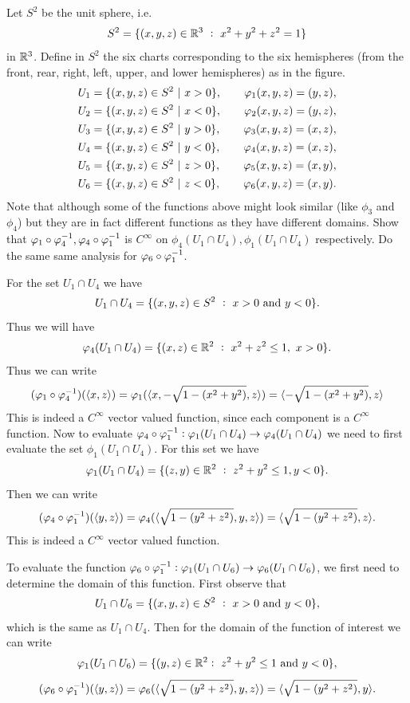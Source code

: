 \begin{problem}
	Let $ S^2 $ be the unit sphere, i.e.
	\[ S^2 = \{(x,y,z)\in\mathbb{R}^3\ :\ x^2+y^2+z^2 = 1\} \]
	in $ \mathbb{R}^3 $. Define in $ S^2 $ the six charts corresponding to the six hemispheres (from the front, rear, right, left, upper, and lower hemispheres) as in the figure.
	\begin{align*}
		U_1 = \{(x,y,z) \in S^2\ |\ x > 0\}, \qquad \varphi_1(x,y,z) = (y,z), \\
		U_2 = \{(x,y,z) \in S^2\ |\ x < 0\}, \qquad \varphi_2(x,y,z) = (y,z), \\
		U_3 = \{(x,y,z) \in S^2\ |\ y > 0\}, \qquad \varphi_3(x,y,z) = (x,z), \\
		U_4 = \{(x,y,z) \in S^2\ |\ y < 0\}, \qquad \varphi_4(x,y,z) = (x,z), \\
		U_5 = \{(x,y,z) \in S^2\ |\ z > 0\}, \qquad \varphi_5(x,y,z) = (x,y), \\
		U_6 = \{(x,y,z) \in S^2\ |\ z < 0\}, \qquad \varphi_6(x,y,z) = (x,y).
	\end{align*}
	Note that although some of the functions above might look similar (like $ \phi_3 $ and $ \phi_4 $) but they are in fact different functions as they have different domains. Show that $ \varphi_1\circ \varphi_4^{-1}, \varphi_4 \circ \varphi_1^{-1} $ is $ C^\infty $ on $ \phi_4(U_1 \cap U_4), \phi_1(U_1 \cap U_4) $ respectively. Do the same same analysis for $ \varphi_6 \circ \varphi_1^{-1}$.
	
\end{problem}
\begin{solution}
	For the set $ U_1 \cap U_4 $ we have
	\[ U_1 \cap U_4 = \{(x,y,z) \in S^2\ :\ x>0 \text{ and } y < 0 \}. \]
	Thus we will have
	\[ \varphi_4(U_1\cap U_4) = \{(x,z)\in \mathbb{R}^2 \ :\ x^2 + z^2 \leq 1,\ x>0\}. \]
	Thus we can write
	\[ (\varphi_1 \circ \varphi_4^{-1})(\langle x,z \rangle ) = \varphi_1(\langle x,-\sqrt{1-(x^2+y^2)},z \rangle) = \langle -\sqrt{1-(x^2+y^2)},z \rangle  \]
	This is indeed a $ C^\infty $ vector valued function, since each component is a $ C^\infty $ function. Now to evaluate $ \varphi_4 \circ \varphi_1^{-1}: \varphi_1(U_1 \cap U_4) \to \varphi_4(U_1\cap U_4) $ we need to first evaluate the set $ \phi_1(U_1 \cap U_4) $. For this set we have
	\[ \varphi_1(U_1 \cap U_4) = \{(z,y)\in\mathbb{R}^2\ :\ z^2 + y^2 \leq 1, y < 0\}. \]
	Then we can write
	\[ (\varphi_4 \circ \varphi_1^{-1})(\langle y,z \rangle ) = \varphi_4(\langle \sqrt{1-(y^2+z^2)}, y,z  \rangle) = \langle \sqrt{1-(y^2+z^2)} , z \rangle. \]
	This is indeed a $ C^\infty $ vector valued function. 
	
	To evaluate the function $ \varphi_6 \circ \varphi^{-1}_1: \varphi_1(U_1 \cap U_6) \to \varphi_6(U_1 \cap U_6) $, we first need to determine the domain of this function. First observe that 
	\[ U_1 \cap U_6 =  \set{(x,y,z) \in S^2\ :\ x>0 \text{ and } y<0}, \]
	which is the same as $ U_1 \cap U_4 $. Then for the domain of the function of interest we can write
	\[ \varphi_1(U_1 \cap U_6) = \{(y,z) \in \mathbb{R}^2 :\ z^2 + y^2 \leq 1 \text{ and } y<0\}, \]
	\[ (\varphi_6 \circ \varphi_1^{-1})(\langle y,z \rangle) = \varphi_6(\langle \sqrt{1-(y^2+z^2)},y,z \rangle) = \langle \sqrt{1-(y^2+z^2)}, y \rangle. \]
\end{solution}

